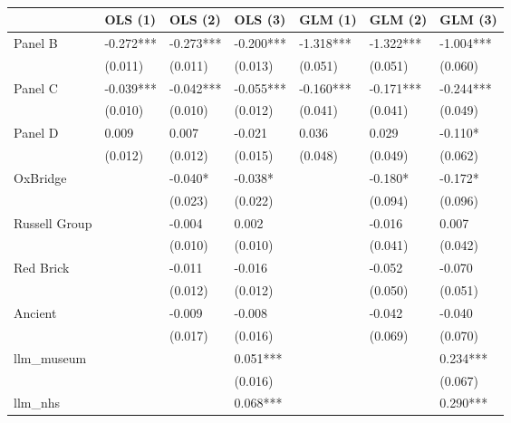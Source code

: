 \begin{table}
\caption{}
\label{}
\begin{center}
\begin{tabular}{lllllll}
\hline
                   & OLS (1)   & OLS (2)   & OLS (3)   & GLM (1)   & GLM (2)   & GLM (3)    \\
\hline
Panel B  & -0.272*** & -0.273*** & -0.200*** & -1.318*** & -1.322*** & -1.004***  \\
                   & (0.011)   & (0.011)   & (0.013)   & (0.051)   & (0.051)   & (0.060)    \\
Panel C  & -0.039*** & -0.042*** & -0.055*** & -0.160*** & -0.171*** & -0.244***  \\
                   & (0.010)   & (0.010)   & (0.012)   & (0.041)   & (0.041)   & (0.049)    \\
Panel D  & 0.009     & 0.007     & -0.021    & 0.036     & 0.029     & -0.110*    \\
                   & (0.012)   & (0.012)   & (0.015)   & (0.048)   & (0.049)   & (0.062)    \\
OxBridge           &           & -0.040*   & -0.038*   &           & -0.180*   & -0.172*    \\
                   &           & (0.023)   & (0.022)   &           & (0.094)   & (0.096)    \\
Russell Group       &           & -0.004    & 0.002     &           & -0.016    & 0.007      \\
                   &           & (0.010)   & (0.010)   &           & (0.041)   & (0.042)    \\
Red Brick           &           & -0.011    & -0.016    &           & -0.052    & -0.070     \\
                   &           & (0.012)   & (0.012)   &           & (0.050)   & (0.051)    \\
Ancient            &           & -0.009    & -0.008    &           & -0.042    & -0.040     \\
                   &           & (0.017)   & (0.016)   &           & (0.069)   & (0.070)    \\
llm\_museum        &           &           & 0.051***  &           &           & 0.234***   \\
                   &           &           & (0.016)   &           &           & (0.067)    \\
llm\_nhs           &           &           & 0.068***  &           &           & 0.290***   \\

\end{tabular}
\end{center}
\end{table}
